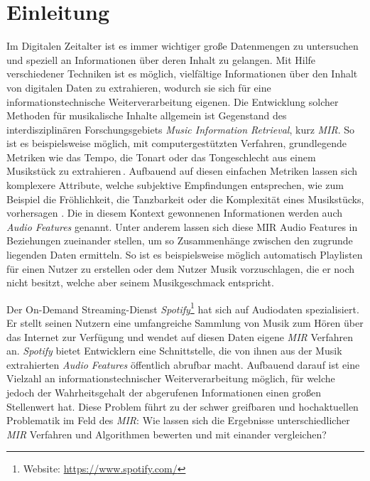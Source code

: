 \section*{Einleitung}
\label{sec:Einleitung}

Im Digitalen Zeitalter ist es immer wichtiger große Datenmengen zu untersuchen und speziell an Informationen über deren Inhalt zu gelangen.
Mit Hilfe verschiedener Techniken ist es möglich, vielfältige Informationen über den Inhalt von digitalen Daten zu extrahieren, wodurch sie sich für eine informationstechnische Weiterverarbeitung eigenen.
Die Entwicklung solcher Methoden für musikalische Inhalte allgemein ist Gegenstand des interdisziplinären Forschungsgebiets \textit{Music Information Retrieval}, kurz \textit{MIR}.
So ist es beispielsweise möglich, mit computergestützten Verfahren, grundlegende Metriken wie das Tempo, die Tonart oder das Tongeschlecht aus einem Musikstück zu extrahieren\,\cite{Casey2008}.
Aufbauend auf diesen einfachen Metriken lassen sich komplexere Attribute, welche subjektive Empfindungen entsprechen, wie zum Beispiel die Fröhlichkeit, die Tanzbarkeit oder die Komplexität eines Musikstücks, vorhersagen \cite{Sturm2013}.
Die in diesem Kontext gewonnenen Informationen werden auch \textit{Audio Features} genannt.
Unter anderem lassen sich diese MIR Audio Features in Beziehungen zueinander stellen, um so Zusammenhänge zwischen den zugrunde liegenden Daten ermitteln.
So ist es beispielsweise möglich automatisch Playlisten für einen Nutzer zu erstellen oder dem Nutzer Musik vorzuschlagen, die er noch nicht besitzt, welche aber seinem Musikgeschmack entspricht.

Der On-Demand Streaming-Dienst \textit{Spotify}\footnote{Website: \url{https://www.spotify.com/}} hat sich auf Audiodaten spezialisiert.
Er stellt seinen Nutzern eine umfangreiche Sammlung von Musik zum Hören über das Internet zur Verfügung und wendet auf diesen Daten eigene \textit{MIR} Verfahren an.
\textit{Spotify} bietet Entwicklern eine Schnittstelle, die von ihnen aus der Musik extrahierten \textit{Audio Features} öffentlich abrufbar macht.
Aufbauend darauf ist eine Vielzahl an informationstechnischer Weiterverarbeitung möglich, für welche jedoch der Wahrheitsgehalt der abgerufenen Informationen einen großen Stellenwert hat.
Diese Problem führt zu der schwer greifbaren und hochaktuellen Problematik im Feld des \textit{MIR}:
Wie lassen sich die Ergebnisse unterschiedlicher \textit{MIR} Verfahren und Algorithmen bewerten und mit einander vergleichen? \cite{Urbano_2013}

